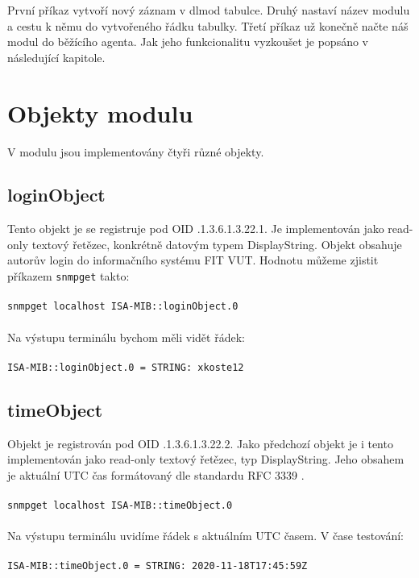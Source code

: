 \documentclass[a4paper,11pt]{article}
\begin{document}
		První příkaz vytvoří nový záznam v dlmod tabulce. Druhý nastaví název modulu a cestu k němu do vytvořeného řádku tabulky. Třetí příkaz už konečně načte náš modul do běžícího agenta. Jak jeho funkcionalitu vyzkoušet je popsáno v následující kapitole.
		
	\section{Objekty modulu}
	\label{section:objs}
		V modulu jsou implementovány čtyři různé objekty.
		
		\subsection{loginObject}
			Tento objekt je se registruje pod OID .1.3.6.1.3.22.1. Je implementován jako read-only textový řetězec, konkrétně datovým typem DisplayString. Objekt obsahuje autorův login do informačního systému FIT VUT. Hodnotu můžeme zjistit příkazem \texttt{snmpget} takto:\\\\
			\texttt{snmpget localhost ISA-MIB::loginObject.0}\\\\
			Na výstupu terminálu bychom měli vidět řádek:\\\\
			\texttt{ISA-MIB::loginObject.0 = STRING: xkoste12}
			
		\subsection{timeObject}
			Objekt je registrován pod OID .1.3.6.1.3.22.2. Jako předchozí objekt je i tento implementován jako read-only textový řetězec, typ DisplayString. Jeho obsahem je aktuální UTC čas formátovaný dle standardu RFC 3339 \cite{rfc}.\\\\
			\texttt{snmpget localhost ISA-MIB::timeObject.0}\\\\
			Na výstupu terminálu uvidíme řádek s aktuálním UTC časem. V čase testování:\\\\
			\texttt{ISA-MIB::timeObject.0 = STRING: 2020-11-18T17:45:59Z}
			
\end{document}
